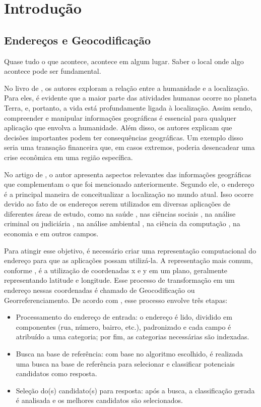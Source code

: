 \chapter{Introdução} \label{Introducao}

\section{Endereços e Geocodificação}
 
\epigraph{Quase tudo o que acontece, acontece em algum lugar. Saber o local onde algo acontece pode ser fundamental.}{\cite{longley2013}}

No livro de \cite{longley2013}, os autores exploram a relação entre a humanidade e a localização. Para eles, é evidente que a maior parte das atividades humanas ocorre no planeta Terra, e, portanto, a vida está profundamente ligada à localização. Assim sendo, compreender e manipular informações geográficas é essencial para qualquer aplicação que envolva a humanidade. Além disso, os autores explicam que decisões importantes podem ter consequências geográficas. Um exemplo disso seria uma transação financeira que, em casos extremos, poderia desencadear uma crise econômica em uma região específica.

No artigo de \cite{Zamberg2009}, o autor apresenta aspectos relevantes das informações geográficas que complementam o que foi mencionado anteriormente. Segundo ele, o endereço é a principal maneira de conceitualizar a localização no mundo atual. Isso ocorre devido ao fato de os endereços serem utilizados em diversas aplicações de diferentes áreas de estudo, como na saúde \cite{AmericaJournal2001, Kypri2009, Mazumdar2008}, nas ciências sociais \cite{Chow2011}, na análise criminal ou judiciária \cite{Olligschlaeger1998}, na análise ambiental \cite{Gilboa2006}, na ciência da computação \cite{Zamberg2009}, na economia \cite{Whitsel2006} e em outros campos.

Para atingir esse objetivo, é necessário criar uma representação computacional do endereço para que as aplicações possam utilizá-la. A representação mais comum, conforme \cite{Zamberg2009}, é a utilização de coordenadas x e y em um plano, geralmente representando latitude e longitude. Esse processo de transformação em um endereço nessas coordenadas é chamado de Geocodificação ou Georreferenciamento. De acordo com \cite{Zamberg2009}, esse processo envolve três etapas:

\begin{itemize}
   \item Processamento do endereço de entrada: o endereço é lido, dividido em componentes (rua, número, bairro, etc.), padronizado e cada campo é atribuído a uma categoria; por fim, as categorias necessárias são indexadas.
   \item Busca na base de referência: com base no algoritmo escolhido, é realizada uma busca na base de referência para selecionar e classificar potenciais candidatos como resposta.
   \item Seleção do(s) candidato(s) para resposta: após a busca, a classificação gerada é analisada e os melhores candidatos são selecionados.
\end{itemize}

